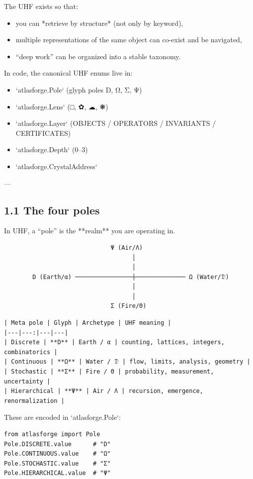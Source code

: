 \documentclass[11pt]{article}
\begin{document}
The UHF exists so that:
\begin{itemize}
\item you can *retrieve by structure* (not only by keyword),
\item multiple representations of the same object can co-exist and be navigated,
\item “deep work” can be organized into a stable taxonomy.
\end{itemize}

In code, the canonical UHF enums live in:

\begin{itemize}
\item `atlasforge.Pole` (glyph poles D, Ω, Σ, Ψ)
\item `atlasforge.Lens` (□, ✿, ☁, ❋)
\item `atlasforge.Layer` (OBJECTS / OPERATORS / INVARIANTS / CERTIFICATES)
\item `atlasforge.Depth` (0–3)
\item `atlasforge.CrystalAddress`
\end{itemize}

---

\subsection{1.1 The four poles}

In UHF, a “pole” is the **realm** you are operating in.

\begin{lstlisting}
                              Ψ (Air/Λ)
                                    │
                                    │
        D (Earth/α) ────────────────┼────────────── Ω (Water/𝔇)
                                    │
                                    │
                              Σ (Fire/Θ)
\end{lstlisting}

\begin{lstlisting}
| Meta pole | Glyph | Archetype | UHF meaning |
|---|---:|---|---|
| Discrete | **D** | Earth / α | counting, lattices, integers, combinatorics |
| Continuous | **Ω** | Water / 𝔇 | flow, limits, analysis, geometry |
| Stochastic | **Σ** | Fire / Θ | probability, measurement, uncertainty |
| Hierarchical | **Ψ** | Air / Λ | recursion, emergence, renormalization |
\end{lstlisting}
These are encoded in `atlasforge.Pole`:

\begin{lstlisting}
from atlasforge import Pole
Pole.DISCRETE.value      # "D"
Pole.CONTINUOUS.value    # "Ω"
Pole.STOCHASTIC.value    # "Σ"
Pole.HIERARCHICAL.value  # "Ψ"
\end{lstlisting}
\end{document}
